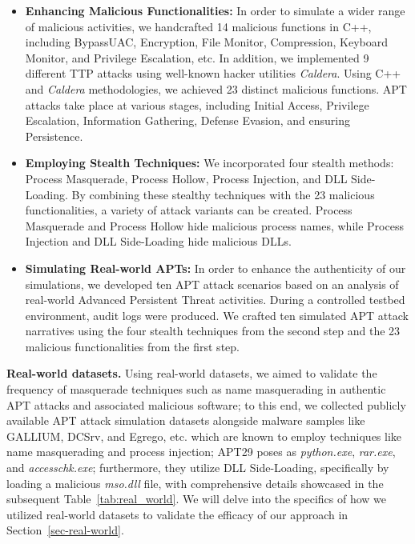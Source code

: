 \begin{itemize}
    \item  \textbf{Enhancing Malicious Functionalities:} In order to simulate a wider range of malicious activities, we handcrafted 14 malicious functions in C++, including BypassUAC, Encryption, File Monitor, Compression, Keyboard Monitor, and Privilege Escalation, etc. In addition, we implemented 9 different TTP attacks using well-known hacker utilities  \textit{Caldera}. Using C++ and \textit{Caldera} methodologies, we achieved 23 distinct malicious functions. APT attacks take place at various stages, including Initial Access, Privilege Escalation, Information Gathering, Defense Evasion, and ensuring Persistence.
    \item \textbf{Employing Stealth Techniques:} We incorporated four stealth methods: Process Masquerade, Process Hollow, Process Injection, and DLL Side-Loading. By combining these stealthy techniques with the 23 malicious functionalities, a variety of attack variants can be created. Process Masquerade and Process Hollow hide malicious process names, while Process Injection and DLL Side-Loading hide malicious DLLs.
    \item \textbf{Simulating Real-world APTs:} In order to enhance the authenticity of our simulations, we developed ten APT attack scenarios based on an analysis of real-world Advanced Persistent Threat activities. During a controlled testbed environment, audit logs were produced. We crafted ten simulated APT attack narratives using the four stealth techniques from the second step and the 23 malicious functionalities from the first step.
\end{itemize}

\noindent
{\bf Real-world datasets.} Using real-world datasets, we aimed to validate the frequency of masquerade techniques such as name masquerading in authentic APT attacks and associated malicious software; to this end, we collected publicly available APT attack simulation datasets alongside malware samples like GALLIUM\cite{cybereason2023}, DCSrv\cite{checkpoint2021}, and Egrego\cite{intrinsec}, etc. which are known to employ techniques like name masquerading and process injection;  APT29 poses as \textit{python.exe}, \textit{rar.exe}, and \textit{accesschk.exe}; furthermore, they utilize DLL Side-Loading, specifically by loading a malicious \textit{mso.dll} file, with comprehensive details showcased in the subsequent Table~\ref{tab:real_world}. We will delve into the specifics of how we utilized real-world datasets to validate the efficacy of our approach in Section~\ref{sec-real-world}.

